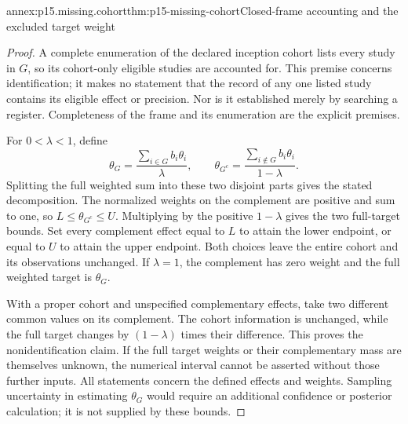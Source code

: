 \begin{annexitem}{annex:p15.missing.cohort}{thm:p15-missing-cohort}{Closed-frame accounting and the excluded target weight}
\begin{proof}
A complete enumeration of the declared inception cohort lists every
study in \(G\), so its cohort-only eligible studies are accounted for.
This premise concerns identification; it makes no statement that the
record of any one listed study contains its eligible effect or precision.
Nor is it established merely by searching a register. Completeness of
the frame and its enumeration are the explicit premises.

For \(0<\lambda<1\), define
\[
 \theta_G=\frac{\sum_{i\in G}b_i\theta_i}{\lambda},\qquad
 \theta_{G^c}=\frac{\sum_{i\notin G}b_i\theta_i}{1-\lambda}.
\]
Splitting the full weighted sum into these two disjoint parts gives
the stated decomposition. The normalized weights on the complement
are positive and sum to one, so \(L\leq\theta_{G^c}\leq U\).
Multiplying by the positive \(1-\lambda\) gives the two full-target
bounds. Set every complement effect equal to \(L\) to attain the
lower endpoint, or equal to \(U\) to attain the upper endpoint.
Both choices leave the entire cohort and its observations unchanged.
If \(\lambda=1\), the complement has zero weight and the full
weighted target is \(\theta_G\).

With a proper cohort and unspecified complementary effects, take two
different common values on its complement. The cohort information is
unchanged, while the full target changes by \((1-\lambda)\) times
their difference. This proves the nonidentification claim. If the
full target weights or their complementary mass are themselves unknown,
the numerical interval cannot be asserted without those further inputs.
All statements concern the defined effects and weights. Sampling
uncertainty in estimating \(\theta_G\) would require an additional
confidence or posterior calculation; it is not supplied by these bounds.
\end{proof}
\end{annexitem}

